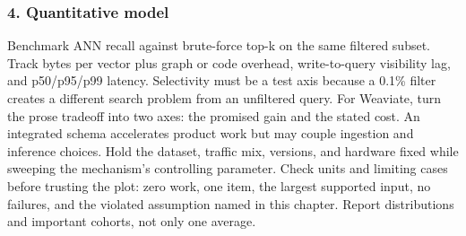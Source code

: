 \subsubsection*{4. Quantitative model}
Benchmark ANN recall against brute-force top-k on the same filtered subset. Track bytes per vector plus graph or code overhead, write-to-query visibility lag, and p50/p95/p99 latency. Selectivity must be a test axis because a 0.1\% filter creates a different search problem from an unfiltered query.
For Weaviate, turn the prose tradeoff into two axes: the promised gain and the stated cost. An integrated schema accelerates product work but may couple ingestion and inference choices. Hold the dataset, traffic mix, versions, and hardware fixed while sweeping the mechanism's controlling parameter.
Check units and limiting cases before trusting the plot: zero work, one item, the largest supported input, no failures, and the violated assumption named in this chapter. Report distributions and important cohorts, not only one average.
